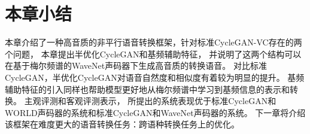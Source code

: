 \section{本章小结}

本章介绍了一种高音质的非平行语音转换框架，针对标准CycleGAN-VC存在的两个问题，
本章提出半优化CycleGAN和基频辅助特征，
并说明了这两个结构可以在基于梅尔频谱的WaveNet声码器下生成高音质的转换语音。
对比标准CycleGAN，半优化CycleGAN对语音自然度和相似度有着较为明显的提升。
基频辅助特征的引入同样也帮助模型更好地从梅尔频谱中学习到基频信息的表示和转换。
主观评测和客观评测表示，
所提出的系统表现优于标准CycleGAN和WORLD声码器的系统和标准CycleGAN和WaveNet声码器的系统。
下一章将介绍该框架在难度更大的语音转换任务：跨语种转换任务上的优化。

